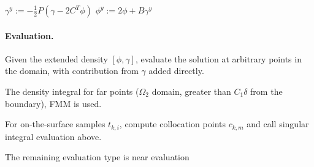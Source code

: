 \documentclass[10pt]{article}
\begin{document}
\begin{algorithmic}
\STATE{}
\STATE{}
\STATE{}
\STATE 	 $\gamma^y := -\frac{1}{2}P(\gamma - 2 C^T \phi)$
\STATE   $\phi^y  := 2\phi + B\gamma^y$          
\end{algorithmic}

\paragraph{Evaluation.}
Given the extended density $[\phi, \gamma]$, evaluate the solution at
arbitrary points in the domain, with contribution from $\gamma$ added
directly. 

The density integral for far points ($\Omega_2$ domain, greater than $C_1
\delta $ from the boundary), FMM is used.

For on-the-surface samples $t_{k,i}$,  compute collocation points $c_{k,m}$ and call 
singular integral evaluation above.

The remaining evaluation type is near evaluation
\end{document}

